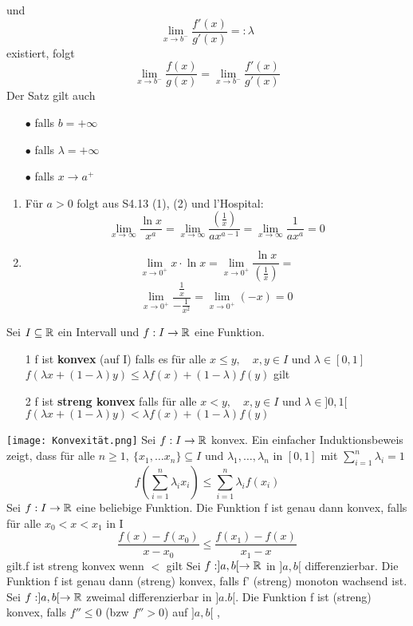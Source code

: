 und
\[ \lim\limits_{x \rightarrow b^-} \frac{f'(x)}{g'(x)} =: \lambda\]
existiert, folgt
\[ \lim\limits_{x \rightarrow b^-} \frac{f(x)}{g(x)} = \lim\limits_{x \rightarrow b^-} \frac{f'(x)}{g'(x)}\]
 Der Satz gilt auch 
\begin{enumerate}
    \item [$\bullet$] falls \(b = + \infty\)
    \item [$\bullet$] falls \( \lambda = + \infty\)
    \item [$\bullet$] falls \( x \rightarrow a^{+}\)
\end{enumerate}
\Bsp[4.25]
\begin{enumerate}
    \item Für \( a > 0\) folgt aus S4.13 (1), (2) und l'Hospital:
    \[ \lim_{x \rightarrow \infty} \frac{\ln x }{x^a} = \lim_{x \rightarrow \infty} \frac{\left( \frac{1}{x}\right)}{ax^{a-1}} = \lim_{x \rightarrow \infty} \frac{1}{ax^a} = 0\]
    \item \[ \lim_{x \rightarrow 0^+} x \cdot \ln x = \lim_{x \rightarrow 0^+} \frac{\ln x }{\left( \frac{1}{x}\right)} = \] 
    \[\lim_{x \rightarrow 0^+} \frac{\frac{1}{x}}{-\frac{1}{x^2}} = \lim_{x \rightarrow 0^+} (-x) = 0\]
\end{enumerate}
\Def[4.26] Sei \(I \subseteq \mathbb{R} \) ein Intervall und \(f: I \rightarrow \mathbb{R} \) eine Funktion.
\begin{enumerate}
    \item [1] f ist \textbf{konvex} (auf I) falls es für alle \newline \(x \leq y, \quad x,y \in I \) und \(\lambda \in [0,1]\) \newline
    \(f(\lambda x + (1 - \lambda)y) \leq \lambda f(x) + (1 - \lambda) f(y)\) gilt
    \item [2] f ist \textbf{streng konvex} falls für alle \newline \(x < y, \quad x,y \in I \) und \( \lambda \in ]0,1[\) \newline
    \(f(\lambda x + (1 - \lambda)y) < \lambda f(x) + (1 - \lambda)f(y)\)
\end{enumerate}
\texttt{[image: Konvexität.png]} \newline
{} Sei \(f : I \rightarrow \mathbb{R} \) konvex. Ein einfacher Induktionsbeweis zeigt, dass für alle \newline \(n \geq 1, \ \{x_1, \dots x_n \} \subseteq I \) und \(\lambda_1, \dots, \lambda_n\) in \([0,1]\) mit \(\sum_{i=1}^n \lambda_i = 1\)
\[f\left(\sum_{i=1}^n \lambda_i x_i\right) \leq \sum_{i=1}^n \lambda_i f(x_i)\]
\Lemma[4.28] Sei \(f : I \rightarrow \mathbb{R} \) eine beliebige Funktion. Die Funktion f ist genau dann konvex, falls für alle \(x_0 < x < x_1 \) in I
\[ \frac{f(x) - f(x_0)}{x - x_0} \leq \frac{f(x_1) - f(x)}{x_1 - x}\]
gilt.\newline f ist streng konvex wenn \( < \) gilt \newline
{} Sei \(f : ]a,b[ \rightarrow \mathbb{R} \) in \(]a,b[\) differenzierbar. Die Funktion f ist genau dann (streng) konvex, falls f' (streng) monoton wachsend ist.
 Sei \(f : ]a,b[ \rightarrow \mathbb{R} \) zweimal differenzierbar in \(]a.b[\). Die Funktion f ist (streng) konvex, falls \(f'' \leq 0\) (bzw \(f'' > 0\)) auf \(]a,b[\)
\sep
